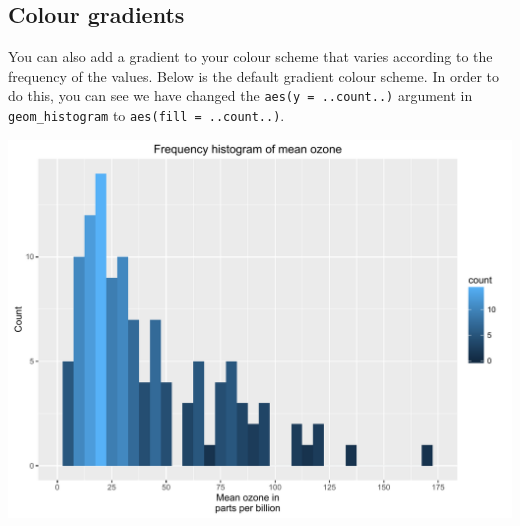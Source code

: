 \subsection{Colour gradients}\label{colour-gradients}

You can also add a gradient to your colour scheme that varies according
to the frequency of the values. Below is the default gradient colour
scheme. In order to do this, you can see we have changed the
\texttt{aes(y\ =\ ..count..)} argument in \texttt{geom\_histogram} to
\texttt{aes(fill\ =\ ..count..)}.

\begin{Shaded}
\begin{Highlighting}[]
\StringTok{ }\NormalTok{(} \StringTok{ }
\StringTok{      }\NormalTok{(}\NormalTok{(}  \NormalTok{) +}
\StringTok{      }\NormalTok{(} \NormalTok{,}
\StringTok{        } \NormalTok{(}\NormalTok{, }\NormalTok{, }\NormalTok{),}
\StringTok{        }\NormalTok{(}\NormalTok{, }\NormalTok{)) +}
\StringTok{      }\NormalTok{(} \NormalTok{) +}
\StringTok{      }\NormalTok{(}\NormalTok{)}
\end{Highlighting}
\end{Shaded}

\begin{center}\includegraphics[width=0.55\linewidth]{figures/histogram_11-1} \end{center}

